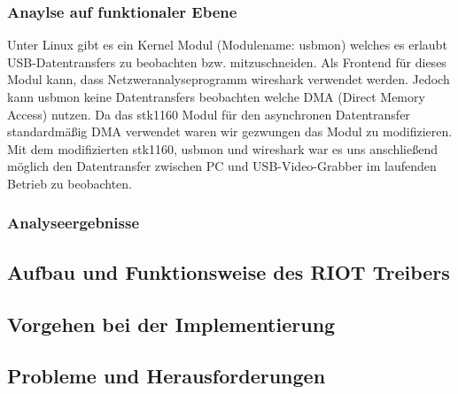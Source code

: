 \subsubsection{Anaylse auf funktionaler Ebene}
Unter Linux gibt es ein Kernel Modul (Modulename: usbmon) welches es erlaubt USB-Datentransfers zu beobachten bzw. 
mitzuschneiden. Als Frontend für dieses Modul kann, dass Netzweranalyseprogramm wireshark verwendet werden. 
Jedoch kann usbmon keine Datentransfers beobachten welche DMA (Direct Memory Access) nutzen. Da das stk1160 Modul für den 
asynchronen Datentransfer standardmäßig DMA verwendet waren wir gezwungen das Modul zu modifizieren.
Mit dem modifizierten stk1160, usbmon und wireshark war es uns anschließend möglich den Datentransfer zwischen PC
und USB-Video-Grabber im laufenden Betrieb zu beobachten.

\subsubsection{Analyseergebnisse}


\subsection{Aufbau und Funktionsweise des RIOT Treibers}

\subsection{Vorgehen bei der Implementierung}

\subsection{Probleme und Herausforderungen}

